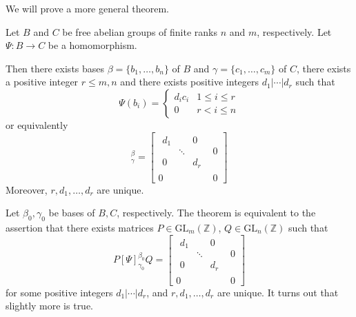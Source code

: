 \documentclass{article}
\begin{document}
We will prove a more general theorem.
\begin{idea}
Let $B$ and $C$ be free abelian groups of finite ranks $n$ and $m$, respectively. Let $\Psi: B\rightarrow C$ be a homomorphism.
\vspace{2mm}

Then there exists bases $\beta=\{b_1,\dots,b_n\}$ of $B$ and $\gamma=\{c_1,\dots,c_m\}$ of $C$, there exists a positive integer $r \le m,n$ and there exists positive integers $d_1|\cdots | d_r$ such that
\begin{equation*}
    \Psi(b_i) = \begin{cases}
        d_ic_i & 1\le i \le r \\
        0 & r < i \le n
    \end{cases}
\end{equation*}
or equivalently
\begin{equation*}
    [\Psi]^\beta_\gamma =
    \left[
        \begin{array}{c|c}
            \begin{array}{ccc}
                d_1 &        & 0   \\
                    & \ddots &     \\
                0   &        & d_r
            \end{array} & 0 \\
            \hline
            0                          & 0
        \end{array}
        \right]
\end{equation*}
Moreover, $r,d_1,\dots,d_r$ are unique.
\end{idea}
Let $\beta_0,\gamma_0$ be bases of $B,C$, respectively. The theorem is equivalent to the assertion that there exists matrices $P\in \text{GL}_m(\mathbb{Z})$, $Q\in \text{GL}_n(\mathbb{Z})$ such that
\begin{equation*}
    P[\Psi]_{\gamma_0}^{\beta_0}Q =     \left[
        \begin{array}{c|c}
            \begin{array}{ccc}
                d_1 &        & 0   \\
                    & \ddots &     \\
                0   &        & d_r
            \end{array} & 0 \\
            \hline
            0                          & 0
        \end{array}
        \right]
\end{equation*}
for some positive integers $d_1|\cdots |d_r$, and $r,d_1,\dots,d_r$ are unique. It turns out that slightly more is true.
\end{document}
